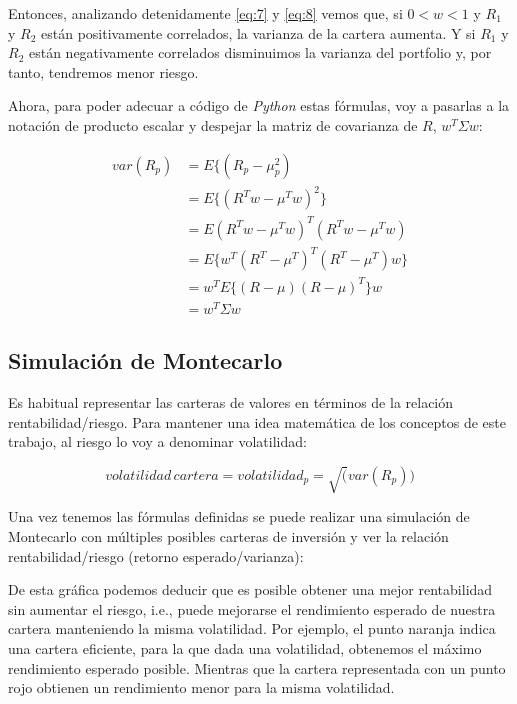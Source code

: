 Entonces, analizando detenidamente \ref{eq:7} y \ref{eq:8} vemos que, si $0 < w < 1$ y $R_{1}$ y $R_{2}$ están positivamente correlados, la varianza de la cartera aumenta. Y si $R_{1}$ y $R_{2}$ están negativamente correlados disminuimos la varianza del portfolio y, por tanto, tendremos menor riesgo. 

Ahora, para poder adecuar a código de \emph{Python} estas fórmulas, voy a pasarlas a la notación de producto escalar y despejar la matriz de covarianza de $R$, $w^{T}\Sigma w$:

\begin{equation} \label{eq:9}
\begin{aligned}
	var(R_{p}) &= E\{(R_{p}-\mu_{p}^{2})\\
	&= E\{(R^{T}w - \mu^{T}w)^{2}\} \\
	&= E{(R^{T}w - \mu^{T}w)^{T}(R^{T}w - \mu^{T}w)} \\
	&= E\{w^{T}(R^{T}-\mu^{T})^{T}(R^{T}-\mu^{T})w\} \\
	&= w^{T}E\{(R-\mu)(R-\mu)^{T}\}w \\
	&= w^{T}\Sigma w
\end{aligned}
\end{equation}

\subsection{Simulación de Montecarlo}

Es habitual representar las carteras de valores en términos de la relación rentabilidad/riesgo. Para mantener una idea matemática de los conceptos de este trabajo, al riesgo lo voy a denominar volatilidad:

\begin{equation}
	volatilidad\, cartera = volatilidad_{p} = \sqrt(var(R_{p}))
\end{equation}

Una vez tenemos las fórmulas definidas se puede realizar una simulación de Montecarlo \citep{online:simulacion_montecarlo} con múltiples posibles carteras de inversión y ver la relación rentabilidad/riesgo (retorno esperado/varianza):


De esta gráfica podemos deducir que es posible obtener una mejor rentabilidad sin aumentar el riesgo, i.e., puede mejorarse el rendimiento esperado de nuestra cartera manteniendo la misma volatilidad. Por ejemplo, el punto naranja indica una cartera eficiente, para la que dada una volatilidad, obtenemos el máximo rendimiento esperado posible. Mientras que la cartera representada con un punto rojo obtienen un rendimiento menor para la misma volatilidad. 


